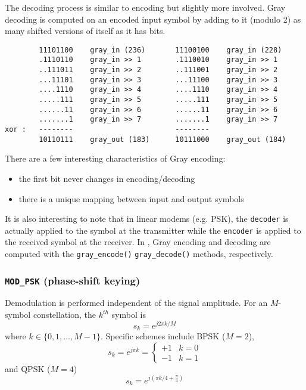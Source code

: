 The decoding process is similar to encoding but slightly more involved.
Gray decoding is computed on an encoded input symbol
by adding to it (modulo 2) as many shifted versions of itself as it has bits.
\begin{verbatim}
        11101100    gray_in (236)       11100100    gray_in (228)
        .1110110    gray_in >> 1        .1110010    gray_in >> 1
        ..111011    gray_in >> 2        ..111001    gray_in >> 2
        ...11101    gray_in >> 3        ...11100    gray_in >> 3
        ....1110    gray_in >> 4        ....1110    gray_in >> 4
        .....111    gray_in >> 5        .....111    gray_in >> 5
        ......11    gray_in >> 6        ......11    gray_in >> 6
        .......1    gray_in >> 7        .......1    gray_in >> 7
xor :   --------                        --------
        10110111    gray_out (183)      10111000    gray_out (184)
\end{verbatim}
There are a few interesting characteristics of Gray encoding:
\begin{itemize}
\item the first bit never changes in encoding/decoding
\item there is a unique mapping between input and output symbols
\end{itemize}
It is also interesting to note that in linear modems (e.g. PSK), the
{\tt decoder} is actually applied to the symbol at the transmitter while the
{\tt encoder} is applied to the received symbol at the receiver.
In \liquid, Gray encoding and decoding are computed with the
{\tt gray\_encode()} {\tt gray\_decode()} methods, respectively.

\subsubsection{{\tt MOD\_PSK} (phase-shift keying)}
\label{module:modem:digital:PSK}
Demodulation is performed independent of the signal amplitude.
For an $M$-symbol constellation, the $k^{th}$ symbol is
\[
    s_k = e^{j 2 \pi k/M}
\]
where $k \in \{0,1,\ldots,M-1\}$.
Specific schemes include BPSK ($M=2$),
\[
    s_k = e^{j \pi k} =
    \begin{cases}
        +1 & k=0 \\
        -1 & k=1
    \end{cases}
\]
and QPSK ($M=4$)
\[
    s_k = e^{j\left(\pi k/4 + \frac{\pi}{4}\right)}
\]

